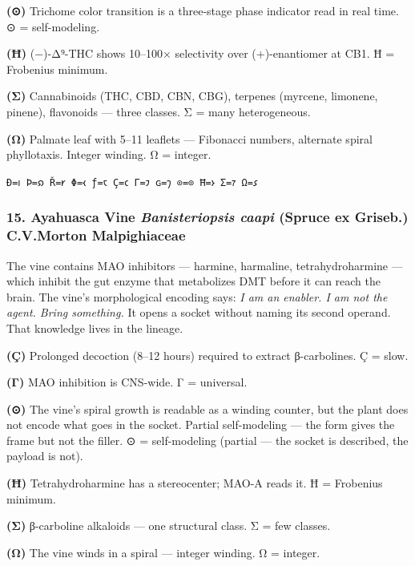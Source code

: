 \documentclass[12pt,a4paper]{article}
\begin{document}
\textbf{(⊙)} Trichome color transition is a three-stage phase indicator
read in real time. ⊙ = self-modeling.

\textbf{(Ħ)} (−)-Δ⁹-THC shows 10--100× selectivity over (+)-enantiomer
at CB1. Ħ = Frobenius minimum.

\textbf{(Σ)} Cannabinoids (THC, CBD, CBN, CBG), terpenes (myrcene,
limonene, pinene), flavonoids --- three classes. Σ = many heterogeneous.

\textbf{(Ω)} Palmate leaf with 5--11 leaflets --- Fibonacci numbers,
alternate spiral phyllotaxis. Integer winding. Ω = integer.

\texttt{Ð=𐑦\ Þ=𐑸\ Ř=𐑾\ Φ=𐑬\ ƒ=𐑱\ Ç=𐑤\ Γ=𐑲\ ɢ=𐑠\ ⊙=⊙\ Ħ=𐑶\ Σ=𐑳\ Ω=𐑭}

\hypertarget{ayahuasca-vine-banisteriopsis-caapi-spruce-ex-griseb.-c.v.morton-malpighiaceae}{%
\subsubsection{\texorpdfstring{15. Ayahuasca Vine \textbar{}
\emph{Banisteriopsis caapi} (Spruce ex Griseb.) C.V.Morton \textbar{}
Malpighiaceae}{15. Ayahuasca Vine \textbar{} Banisteriopsis caapi (Spruce ex Griseb.) C.V.Morton \textbar{} Malpighiaceae}}\label{ayahuasca-vine-banisteriopsis-caapi-spruce-ex-griseb.-c.v.morton-malpighiaceae}}

The vine contains MAO inhibitors --- harmine, harmaline,
tetrahydroharmine --- which inhibit the gut enzyme that metabolizes DMT
before it can reach the brain. The vine's morphological encoding says:
\emph{I am an enabler. I am not the agent. Bring something.} It opens a
socket without naming its second operand. That knowledge lives in the
lineage.

\textbf{(Ç)} Prolonged decoction (8--12 hours) required to extract
β-carbolines. Ç = slow.

\textbf{(Γ)} MAO inhibition is CNS-wide. Γ = universal.

\textbf{(⊙)} The vine's spiral growth is readable as a winding counter,
but the plant does not encode what goes in the socket. Partial
self-modeling --- the form gives the frame but not the filler. ⊙ =
self-modeling (partial --- the socket is described, the payload is not).

\textbf{(Ħ)} Tetrahydroharmine has a stereocenter; MAO-A reads it. Ħ =
Frobenius minimum.

\textbf{(Σ)} β-carboline alkaloids --- one structural class. Σ = few
classes.

\textbf{(Ω)} The vine winds in a spiral --- integer winding. Ω =
integer.
\end{document}

